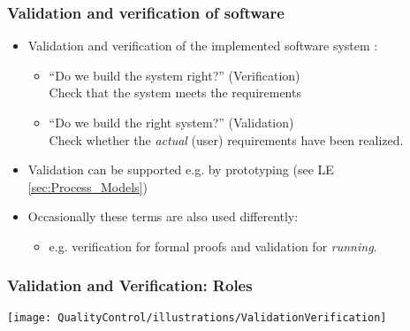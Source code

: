 \begin{frame}
\frametitle{Validation and verification of software}
\begin{itemize}
  \item Validation and verification of the implemented software system \citep{Boehm1984,FisherVV2007}:
    \begin{itemize}
      \item "`Do we build the system right?"' (Verification)\\
            Check  that the system meets the requirements
      \item "`Do we build the right system?"' (Validation)\\
            Check whether the \emph{actual} (user) requirements have been realized.
    \end{itemize}
  \item Validation can be supported e.g. by prototyping (see LE \ref{sec:Process_Models})
  \item Occasionally these terms are also used differently:
    \begin{itemize}
      \item e.g. verification for formal proofs and validation for \emph{running}.
    \end{itemize}
\end{itemize}
\end{frame}


\begin{frame}\frametitle{Validation and Verification: Roles}
\begin{center}
\texttt{[image: QualityControl/illustrations/ValidationVerification]}
\end{center}
\end{frame}


